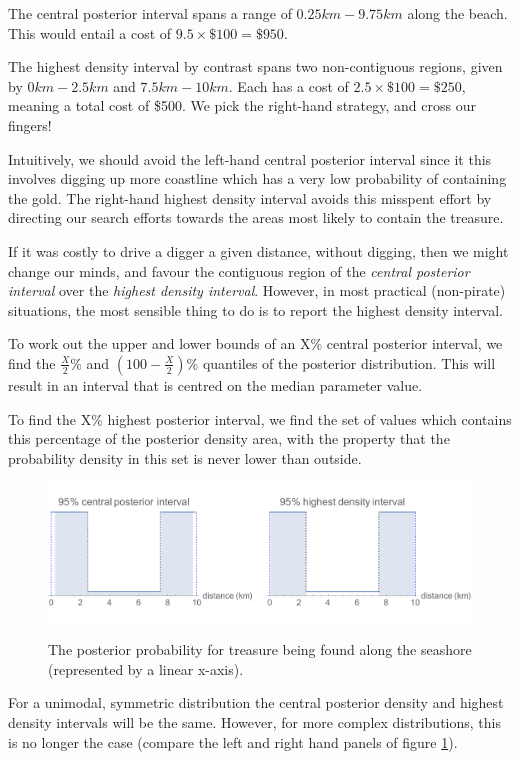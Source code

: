 \documentclass[11pt,fullpage]{book}
\begin{document}
The central posterior interval spans a range of $0.25km-9.75km$ along the beach. This would entail a cost of $9.5\times \$100 = \$950$.

The highest density interval by contrast spans two non-contiguous regions, given by $0km-2.5km$ and $7.5km-10km$. Each has a cost of $2.5\times\$100 = \$250$, meaning a total cost of \$500. We pick the right-hand strategy, and cross our fingers!

Intuitively, we should avoid the left-hand central posterior interval since it this involves digging up more coastline which has a very low probability of containing the gold. The right-hand highest density interval avoids this misspent effort by directing our search efforts towards the areas most likely to contain the treasure.

If it was costly to drive a digger a given distance, without digging, then we might change our minds, and favour the contiguous region of the \textit{central posterior interval} over the \textit{highest density interval}. However, in most practical (non-pirate) situations, the most sensible thing to do is to report the highest density interval.

To work out the upper and lower bounds of an X\% central posterior interval, we find the $\frac{X}{2}\%$ and $(100-\frac{X}{2})\%$ quantiles of the posterior distribution. This will result in an interval that is centred on the median parameter value.

To find the X\% highest posterior interval, we find the set of values which contains this percentage of the posterior density area, with the property that the probability density in this set is never lower than outside.

\begin{figure}
\centering
\scalebox{0.35} 
{\includegraphics{Posterior_CPIvsHDI.pdf}}
\caption{The posterior probability for treasure being found along the seashore (represented by a linear x-axis).}\label{fig:Posterior_CPIvsHDI}
\end{figure}

For a unimodal, symmetric distribution the central posterior density and highest density intervals will be the same. However, for more complex distributions, this is no longer the case (compare the left and right hand panels of figure \ref{fig:Posterior_CPIvsHDI}).
\end{document}
